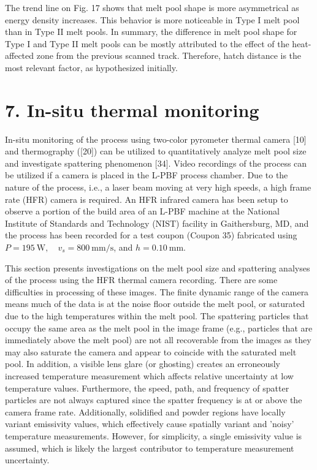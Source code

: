 \documentclass[10pt]{article}
\begin{document}
The trend line on Fig. 17 shows that melt pool shape is more asymmetrical as energy density increases. This behavior is more noticeable in Type I melt pool than in Type II melt pools. In summary, the difference in melt pool shape for Type I and Type II melt pools can be mostly attributed to the effect of the heat-affected zone from the previous scanned track. Therefore, hatch distance is the most relevant factor, as hypothesized initially.

\section*{7. In-situ thermal monitoring}
In-situ monitoring of the process using two-color pyrometer thermal camera [10] and thermography ([20]) can be utilized to quantitatively analyze melt pool size and investigate spattering phenomenon [34]. Video recordings of the process can be utilized if a camera is placed in the L-PBF process chamber. Due to the nature of the process, i.e., a laser beam moving at very high speeds, a high frame rate (HFR) camera is required. An HFR infrared camera has been setup to observe a portion of the build area of an L-PBF machine at the National Institute of Standards and Technology (NIST) facility in Gaithersburg, MD, and the process has been recorded for a test coupon (Coupon 35) fabricated using $P=195 \mathrm{~W}, \quad v_{s}=800 \mathrm{~mm} / \mathrm{s}$, and $h=0.10 \mathrm{~mm}$.

This section presents investigations on the melt pool size and spattering analyses of the process using the HFR thermal camera recording. There are some difficulties in processing of these images. The finite dynamic range of the camera means much of the data is at the noise floor outside the melt pool, or saturated due to the high temperatures within the melt pool. The spattering particles that occupy the same area as the melt pool in the image frame (e.g., particles that are immediately above the melt pool) are not all recoverable from the images as they may also saturate the camera and appear to coincide with the saturated melt pool. In addition, a visible lens glare (or ghosting) creates an erroneously increased temperature measurement which affects relative uncertainty at low temperature values. Furthermore, the speed, path, and frequency of spatter particles are not always captured since the spatter frequency is at or above the camera frame rate. Additionally, solidified and powder regions have locally variant emissivity values, which effectively cause spatially variant and 'noisy' temperature measurements. However, for simplicity, a single emissivity value is assumed, which is likely the largest contributor to temperature measurement uncertainty.
\end{document}
